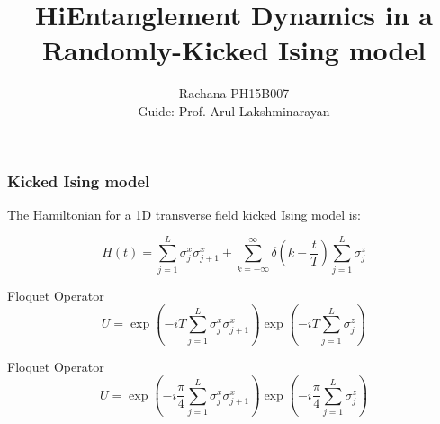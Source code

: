 \documentclass[11pt]{beamer}
\begin{document}
	
	
	
	\begin{frame}[plain]
	\end{frame}
	
	\title{\textbf{Hi}}
	\author{}
	\begin{frame}[plain]
	\maketitle
	\end{frame}

	\author{Rachana-PH15B007\\Guide: Prof. Arul Lakshminarayan}
	\title{Entanglement Dynamics in a Randomly-Kicked Ising model}
	\date{}
	\subject{Mini Project Jan-May 2019}
	\begin{frame}[plain]
	\maketitle
	\end{frame}



\begin{frame}
\frametitle{Kicked Ising model}
The Hamiltonian for a 1D transverse field kicked Ising model is: 

\begin{equation}\label{key}
H(t)= \sum_{j=1}^{L}\sigma_{j}^{x} \sigma_{j+1}^{x} + \sum_{k=-\infty}^{\infty}\delta(k-\dfrac{t}{T})\sum_{j=1}^{L}\sigma_{j}^{z}
\end{equation}
\end{frame}


\begin{frame}{Floquet Operator}
\begin{equation}
U = \exp(-iT\sum_{j=1}^{L}\sigma_{j}^{x} \sigma_{j+1}^{x})  \exp(-iT\sum_{j=1}^{L}\sigma_{j}^{z})
\end{equation}
\end{frame}


\begin{frame}{Floquet Operator \cite{PhysRevA.91.022318}}
 \begin{equation}
U = \exp(-i\dfrac{\pi}{4}\sum_{j=1}^{L}\sigma_{j}^{x} \sigma_{j+1}^{x})  \exp(-i\dfrac{\pi}{4}\sum_{j=1}^{L}\sigma_{j}^{z})
\end{equation}
\end{frame}
\end{document}
